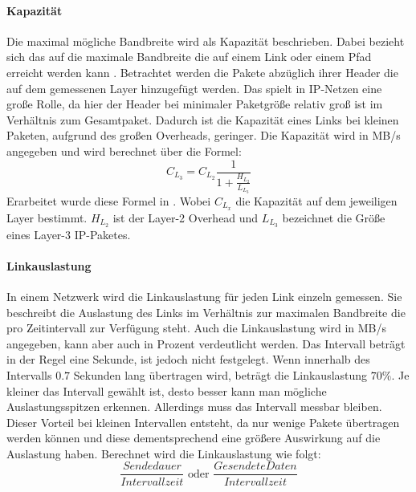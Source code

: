 \documentclass[draft=false
              ,paper=a4
              ,twoside=false
              ,fontsize=11pt
              ,headsepline
              ,BCOR10mm
              ,DIV11
              ]{scrbook}
\begin{document}
\paragraph{Kapazität} %
\label{par:kapazitat}
Die maximal mögliche Bandbreite wird als Kapazität beschrieben. Dabei bezieht sich das auf die maximale Bandbreite die auf einem Link oder einem Pfad erreicht werden kann \cite{prasad_bandwidth_2003}. Betrachtet werden die Pakete abzüglich ihrer Header die auf dem gemessenen Layer hinzugefügt werden. Das spielt in IP-Netzen eine große Rolle, da hier der Header bei minimaler Paketgröße relativ groß ist im Verhältnis zum Gesamtpaket. Dadurch ist die Kapazität eines Links bei kleinen Paketen, aufgrund des großen Overheads, geringer. Die Kapazität wird in MB/s angegeben und wird berechnet über die Formel: 
\begin{equation}
  C_{L_3} = C_{L_2} \frac{1}{1+\frac{H_{L_2}}{L_{L_3}}}
\end{equation}
Erarbeitet wurde diese Formel in \cite{prasad_bandwidth_2003}. Wobei $C_{L_x}$ die Kapazität auf dem jeweiligen Layer bestimmt. $H_{L_2}$ ist der Layer-2 Overhead und $L_{L_3}$ bezeichnet die Größe eines Layer-3 IP-Paketes.

\paragraph{Linkauslastung} %
\label{par:linkauslastung}
In einem Netzwerk wird die Linkauslastung für jeden Link einzeln gemessen. Sie beschreibt die Auslastung des Links im Verhältnis zur maximalen Bandbreite die pro Zeitintervall zur Verfügung steht. Auch die Linkauslastung wird in MB/s angegeben, kann aber auch in Prozent verdeutlicht werden. Das Intervall beträgt in der Regel eine Sekunde, ist jedoch nicht festgelegt. Wenn innerhalb des Intervalls $0.7$ Sekunden lang übertragen wird, beträgt die Linkauslastung $70\%$. Je kleiner das Intervall gewählt ist, desto besser kann man mögliche Auslastungsspitzen erkennen. Allerdings muss das Intervall messbar bleiben. Dieser Vorteil bei kleinen Intervallen entsteht, da nur wenige Pakete übertragen werden können und diese dementsprechend eine größere Auswirkung auf die Auslastung haben. Berechnet wird die Linkauslastung wie folgt:
\begin{equation}
  \label{eq:5}
  \frac{Sendedauer}{Intervallzeit} \textrm{ oder } \frac{GesendeteDaten}{Intervallzeit}
\end{equation}

\end{document}
